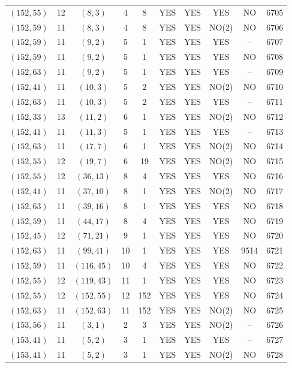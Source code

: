 \begin{longtable}{|c|c|c|c|c|c|c|c|c|c|}
$(152, 55)$ & 12 & $(8, 3)$ & 4 & 8 & YES & YES & YES & NO & 6705\\
$(152, 59)$ & 11 & $(8, 3)$ & 4 & 8 & YES & YES & NO(2) & NO & 6706\\
$(152, 59)$ & 11 & $(9, 2)$ & 5 & 1 & YES & YES & YES & -- & 6707\\
$(152, 59)$ & 11 & $(9, 2)$ & 5 & 1 & YES & YES & YES & NO & 6708\\
$(152, 63)$ & 11 & $(9, 2)$ & 5 & 1 & YES & YES & YES & -- & 6709\\
$(152, 41)$ & 11 & $(10, 3)$ & 5 & 2 & YES & YES & NO(2) & NO & 6710\\
$(152, 63)$ & 11 & $(10, 3)$ & 5 & 2 & YES & YES & YES & -- & 6711\\
$(152, 33)$ & 13 & $(11, 2)$ & 6 & 1 & YES & YES & NO(2) & NO & 6712\\
$(152, 41)$ & 11 & $(11, 3)$ & 5 & 1 & YES & YES & YES & -- & 6713\\
$(152, 63)$ & 11 & $(17, 7)$ & 6 & 1 & YES & YES & NO(2) & NO & 6714\\
$(152, 55)$ & 12 & $(19, 7)$ & 6 & 19 & YES & YES & NO(2) & NO & 6715\\
$(152, 55)$ & 12 & $(36, 13)$ & 8 & 4 & YES & YES & YES & NO & 6716\\
$(152, 41)$ & 11 & $(37, 10)$ & 8 & 1 & YES & YES & NO(2) & NO & 6717\\
$(152, 63)$ & 11 & $(39, 16)$ & 8 & 1 & YES & YES & YES & NO & 6718\\
$(152, 59)$ & 11 & $(44, 17)$ & 8 & 4 & YES & YES & YES & NO & 6719\\
$(152, 45)$ & 12 & $(71, 21)$ & 9 & 1 & YES & YES & YES & NO & 6720\\
$(152, 63)$ & 11 & $(99, 41)$ & 10 & 1 & YES & YES & YES & 9514 & 6721\\
$(152, 59)$ & 11 & $(116, 45)$ & 10 & 4 & YES & YES & YES & NO & 6722\\
$(152, 55)$ & 12 & $(119, 43)$ & 11 & 1 & YES & YES & YES & NO & 6723\\
$(152, 55)$ & 12 & $(152, 55)$ & 12 & 152 & YES & YES & YES & NO & 6724\\
$(152, 63)$ & 11 & $(152, 63)$ & 11 & 152 & YES & YES & NO(2) & NO & 6725\\
$(153, 56)$ & 11 & $(3, 1)$ & 2 & 3 & YES & YES & NO(2) & -- & 6726\\
$(153, 41)$ & 11 & $(5, 2)$ & 3 & 1 & YES & YES & YES & -- & 6727\\
$(153, 41)$ & 11 & $(5, 2)$ & 3 & 1 & YES & YES & NO(2) & NO & 6728\\

\end{longtable}
